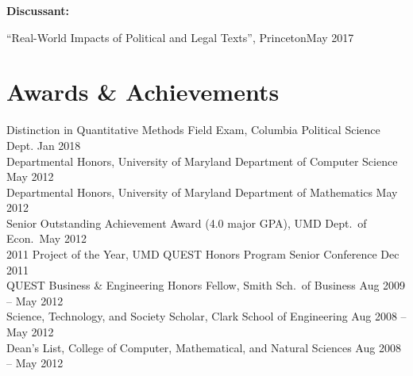 \documentclass[letterpaper,11pt]{article}
\newcommand{\cvitemsep}{2mm}
\begin{document}

\textbf{Discussant:}\vspace{\cvitemsep}

``Real-World Impacts of Political and Legal Texts'', Princeton\hfill May 2017 \\


\section{Awards \& Achievements}

Distinction in Quantitative Methods Field Exam, Columbia Political Science Dept. \hfill Jan 2018\vspace{1mm}\\
Departmental Honors, University of Maryland Department of Computer Science \hfill May 2012\vspace{1mm}\\%
Departmental Honors, University of Maryland Department of Mathematics \hfill May 2012\vspace{1mm}\\%
Senior Outstanding Achievement Award (4.0 major GPA), UMD Dept.\ of Econ.\ \hfill May 2012\vspace{1mm}\\%
2011 Project of the Year, UMD QUEST Honors Program Senior Conference \hfill Dec 2011\vspace{1mm}\\%
QUEST Business \& Engineering Honors Fellow, Smith Sch.\ of Business \hfill Aug 2009 -- May 2012\vspace{1mm}\\%
Science, Technology, and Society Scholar, Clark School of Engineering \hfill Aug 2008 -- May 2012\vspace{1mm}\\%
Dean's List, College of Computer, Mathematical, and Natural Sciences \hfill Aug 2008 -- May 2012\\
\end{document}

